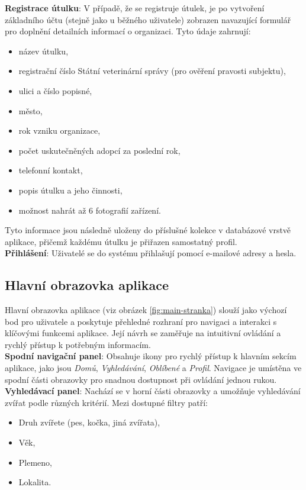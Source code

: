 \documentclass[czech, bp, kiv, he, iso690numb, pdf]{fasthesis}
\begin{document}
    \noindent \textbf{Registrace útulku}: V případě, že se registruje útulek, je po vytvoření základního účtu (stejně jako u běžného uživatele) zobrazen navazující formulář pro doplnění detailních informací o organizaci. Tyto údaje zahrnují:
    \begin{itemize}[leftmargin=2em]
        \item název útulku,
        \item registrační číslo Státní veterinární správy (pro ověření pravosti subjektu),
        \item ulici a číslo popisné,
        \item město,
        \item rok vzniku organizace,
        \item počet uskutečněných adopcí za poslední rok,
        \item telefonní kontakt,
        \item popis útulku a jeho činnosti,
        \item možnost nahrát až 6 fotografií zařízení.
    \end{itemize}

    \noindent Tyto informace jsou následně uloženy do příslušné kolekce v databázové vrstvě aplikace, přičemž každému útulku je přiřazen samostatný profil.\\

    \noindent \textbf{Přihlášení}: Uživatelé se do systému přihlašují pomocí e-mailové adresy a hesla.


    \subsection{Hlavní obrazovka aplikace}

    Hlavní obrazovka aplikace (viz obrázek \ref{fig:main-stranka}) slouží jako výchozí bod pro uživatele a poskytuje přehledné rozhraní pro navigaci a interakci s klíčovými funkcemi aplikace. Její návrh se zaměřuje na intuitivní ovládání a rychlý přístup k potřebným informacím.\\

    \noindent \textbf{Spodní navigační panel}: Obsahuje ikony pro rychlý přístup k hlavním sekcím aplikace, jako jsou \textit{Domů}, \textit{Vyhledávání}, \textit{Oblíbené} a \textit{Profil}. Navigace je umístěna ve spodní části obrazovky pro snadnou dostupnost při ovládání jednou rukou.\\

    \noindent \textbf{Vyhledávací panel}: Nachází se v horní části obrazovky a umožňuje vyhledávání zvířat podle různých kritérií. Mezi dostupné filtry patří:
    \begin{itemize}
        \item Druh zvířete (pes, kočka, jiná zvířata),
        \item Věk,
        \item Plemeno,
        \item Lokalita.
    \end{itemize}
\end{document}
